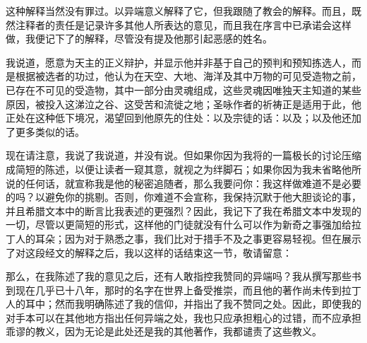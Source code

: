 这种解释当然没有罪过。以异端意义解释了它，但我跟随了教会的解释。而且，既然注释者的责任是记录许多其他人所表达的意见，而且我在序言中已承诺会这样做，我便记下了的解释，尽管没有提及他那引起恶感的姓名。\par

我说道，愿意为天主的正义辩护，并显示他并非基于自己的预判和预知拣选人，而是根据被选者的功过，他认为在天空、大地、海洋及其中万物的可见受造物之前，已存在不可见的受造物，其中一部分由灵魂组成，这些灵魂因唯独天主知道的某些原因，被投入这涕泣之谷、这受苦和流徙之地；圣咏作者的祈祷正是适用于此，他正处在这种低下境况，渴望回到他原先的住处：以及宗徒的话：以及；以及他还加了更多类似的话。\par

现在请注意，我说了我说道，并没有说。但如果你因为我将的一篇极长的讨论压缩成简短的陈述，以便让读者一窥其意，就视之为绊脚石；如果你因为我未省略他所说的任何话，就宣称我是他的秘密追随者，那么我要问你：我这样做难道不是必要的吗？以避免你的挑剔。否则，你难道不会宣称，我保持沉默于他大胆谈论的事，并且希腊文本中的断言比我表述的更强烈？因此，我记下了我在希腊文本中发现的一切，尽管以更简短的形式，这样他的门徒就没有什么可以作为新奇之事强加给拉丁人的耳朵；因为对于熟悉之事，我们比对于措手不及之事更容易轻视。但在展示了对这段经文的解释之后，我以这样的话结束这一节，敬请留意：\par

\par

那么，在我陈述了我的意见之后，还有人敢指控我赞同的异端吗？我从撰写那些书到现在几乎已十八年，那时的名字在世界上备受推崇，而且他的著作尚未传到拉丁人的耳中；然而我明确陈述了我的信仰，并指出了我不赞同之处。因此，即使我的对手本可以在其他地方指出任何异端之处，我也只应承担粗心的过错，而不应承担乖谬的教义，因为无论是此处还是我的其他著作，我都谴责了这些教义。\par

